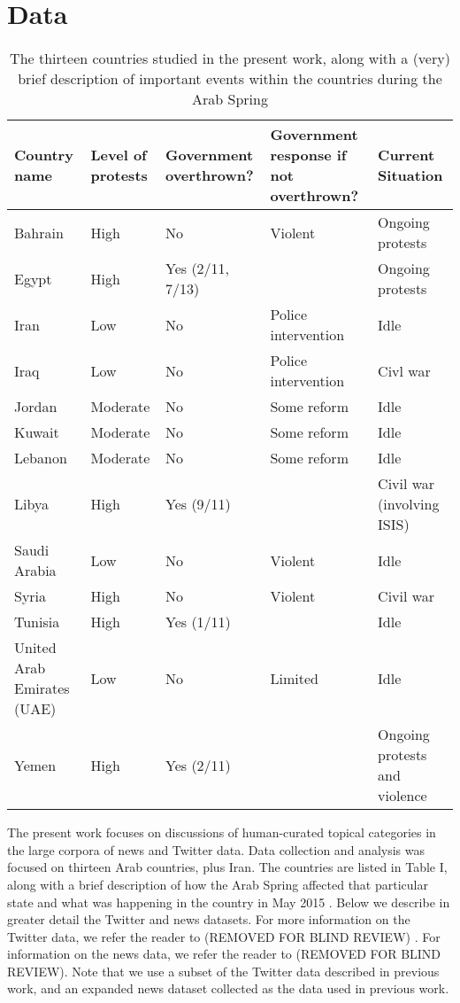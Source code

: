 \section{Data}

\begin{table*}
	\centering
	\begin{tabularx}{\textwidth}{| m{3.7cm} | m{2cm} |m{2cm}| m{3cm}|X  |}
		\hline
		{\bf Country name} & {\bf Level of protests} & {\bf Government overthrown?} & {\bf Government response if not overthrown?} & {\bf Current Situation}  \\ \hline
		Bahrain & High & No & Violent  & Ongoing protests   \\ \hline
		Egypt & High & Yes (2/11, 7/13) &  & Ongoing protests\\ \hline
		Iran & Low &  No & Police intervention & Idle \\ \hline
		Iraq & Low & No & Police intervention & Civl war    \\ \hline
		Jordan & Moderate &  No & Some reform  & Idle\\ \hline
		Kuwait &  Moderate & No & Some reform & Idle \\ \hline
		Lebanon & Moderate & No & Some reform & Idle  \\ \hline
		Libya & High & Yes (9/11) & & Civil war (involving ISIS)  \\ \hline
		Saudi Arabia & Low & No & Violent & Idle  \\ \hline
		Syria & High & No & Violent & Civil war \\ \hline
		Tunisia & High & Yes (1/11) &  & Idle  \\ \hline
		United Arab Emirates (UAE)   &  Low & No & Limited  & Idle  \\ \hline
		Yemen &  High & Yes (2/11) &	 & Ongoing protests and violence \\ \hline
	\end{tabularx}
	\caption{The thirteen countries studied in the present work, along with a (very) brief description of important events within the countries during the Arab Spring}
	\label{tab:countries}
\end{table*}


The present work focuses on discussions of human-curated topical categories in the large corpora of news and Twitter data. Data collection and analysis was focused on thirteen Arab countries, plus Iran. The countries are listed in Table I, along with a brief description of how the Arab Spring affected that particular state and what was happening in the country in May 2015 . Below we describe in greater detail the Twitter and news datasets. For more information on the Twitter data, we refer the reader to (REMOVED FOR BLIND REVIEW) . For information on the news data, we refer the reader to (REMOVED FOR BLIND REVIEW). Note that we use a subset of the Twitter data described in previous work, and an expanded news dataset collected as the data used in previous work.

